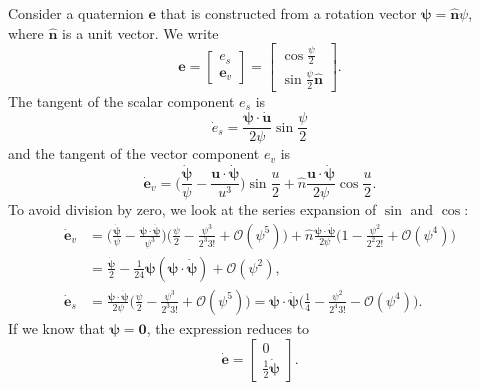 \documentclass[preprint,12pt]{elsarticle}
\let\vec\bm
\numberwithin{equation}{section}
\def\rv{\psi}
\def\quat{e}
\begin{document}
Consider a quaternion $\vec{e}$ that is constructed from a rotation vector $\vec{\rv} = \hat{\vec{n}}\rv$, where $\hat{\vec{n}}$ is a unit vector.
We write
\begin{equation}
    \vec{\quat} = \begin{bmatrix} \quat_s \\ \vec{\quat}_v \end{bmatrix} = \begin{bmatrix} \cos{\frac{\rv}{2}} \\ \sin{\frac{\rv}{2}} \hat{\vec{n}} \end{bmatrix}.
\end{equation}
The tangent of the scalar component $\quat_s$ is
\begin{equation}
    \dot{\quat}_s = \frac{\vec{\rv} \cdot \dot{\vec{u}}}{2 \rv} \sin{\frac{\rv}{2}}
\end{equation}
and the tangent of the vector component $\quat_v$ is
\begin{equation}
    \dot{\vec{\quat}}_v = \Big(\frac{ \dot{\vec{\rv}}}{\rv} - \frac{\vec{u} \cdot \dot{\vec{\rv}}}{u^3}\Big)\sin{\frac{u}{2}} +  \hat{n} \frac{\vec{u} \cdot \dot{\vec{\rv}}}{2\rv} \cos{\frac{u}{2}}.
\end{equation}
To avoid division by zero, we look at the series expansion of $\sin$ and $\cos$:
\begin{equation}
    \begin{aligned}
        \dot{\vec{\quat}}_v &= \Big(\frac{ \dot{\vec{\rv}}}{\rv} - \frac{\vec{\rv} \cdot \dot{\vec{\rv}}}{\rv^3}\Big)\Big(\frac{\rv}{2} - \frac{\rv^3}{2^3 3!} +\mathcal{O}(\rv^5)\Big) +  \hat{n} \frac{\vec{\rv} \cdot \dot{\vec{\rv}}}{2\rv} \Big( 1 - \frac{\rv^2}{2^2 2!} + \mathcal{O}(\rv^4)\Big)
        \\&= \frac{\dot{\vec{\rv}}}{2} - \frac{1}{24} \vec{\rv}(\vec{\rv} \cdot \dot{\vec{\rv}})  + \mathcal{O}(\rv^2), \\
        \dot{\vec{\quat}}_s &= \frac{\vec{\rv} \cdot \dot{\vec{\rv}}}{2 \rv}(\frac{\rv}{2} - \frac{\rv^3}{2^3 3!} +\mathcal{O}(\rv^5)\Big) = \vec{\rv} \cdot \dot{\vec{\rv}} \Big( \frac{1}{4} - \frac{\rv^2}{2^4 3!} - \mathcal{O}(\rv^4)\Big).
    \end{aligned}
\end{equation}
If we know that $\vec{\rv}=\vec{0}$, the expression reduces to
\begin{equation}
    \dot{\vec{\quat}} = \begin{bmatrix} 0 \\ \frac{1}{2} \dot{\vec{\rv}} \end{bmatrix}.
\end{equation}
\end{document}
